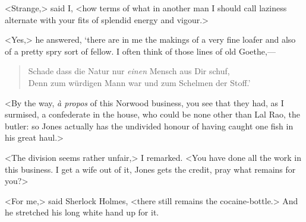 <Strange,> said I, <how terms of what in another man I should call laziness alternate with your fits of splendid energy and vigour.>

<Yes,> he answered, `there are in me the makings of a very fine loafer and also of a pretty spry sort of fellow. I often think of those lines of old Goethe,—
\begin{german}
\begin{verse}
Schade dass die Natur nur \textit{einen} Mensch aus Dir schuf,\\
Denn zum würdigen Mann war und zum Schelmen der Stoff.'
\end{verse}
\end{german}

<By the way, \textit{à propos} of this Norwood business, you see that they had, as I surmised, a confederate in the house, who could be none other than Lal Rao, the butler: so Jones actually has the undivided honour of having caught one fish in his great haul.>

<The division seems rather unfair,> I remarked. <You have done all the work in this business. I get a wife out of it, Jones gets the credit, pray what remains for you?>

<For me,> said Sherlock Holmes, <there still remains the cocaine-bottle.> And he stretched his long white hand up for it.